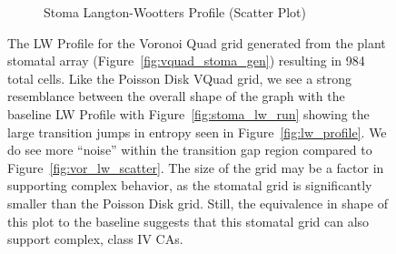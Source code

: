 \documentclass[a4paper,11pt]{article}
\begin{document}
\begin{figure}[htp]
\begin{subfigure}[t]{0.65\textwidth}
  \caption{Stoma Langton-Wootters Profile (Scatter Plot)}
  \label{fig:stoma_lw_scatter}
  \end{subfigure}
\caption[Stoma Langton-Wootters Profile]{
  The LW Profile for the Voronoi Quad grid generated from the plant stomatal array (Figure~\ref{fig:vquad_stoma_gen}) resulting in 984 total cells. Like the Poisson Disk VQuad grid, we see a strong resemblance between the overall shape of the graph with the baseline LW Profile with Figure~\ref{fig:stoma_lw_run} showing the large transition jumps in entropy seen in Figure~\ref{fig:lw_profile}. We do see more ``noise'' within the transition gap region compared to Figure~\ref{fig:vor_lw_scatter}. The size of the grid may be a factor in supporting complex behavior, as the stomatal grid is significantly smaller than the Poisson Disk grid. Still, the equivalence in shape of this plot to the baseline suggests that this stomatal grid can also support complex, class IV CAs.
}
\label{fig:stoma_lw_profile}
\end{figure}
\end{document}
